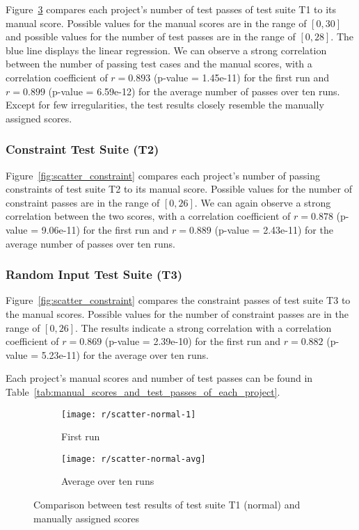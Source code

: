 Figure~\ref{fig:scatter_normal} compares each project's number of test passes of test suite T1 to its manual score.
Possible values for the manual scores are in the range of $[0, 30]$ and possible values for the number of test passes are in the range of $[0, 28]$.
The blue line displays the linear regression.
We can observe a strong correlation between the number of passing test cases and the manual scores,
with a correlation coefficient of $r = 0.893$ (p-value = 1.45e-11) for the first run and $r = 0.899$ (p-value = 6.59e-12) for the average number of passes over ten runs.
Except for few irregularities, the test results closely resemble the manually assigned scores.

\subsubsection{Constraint Test Suite (T2)}

Figure~\ref{fig:scatter_constraint} compares each project's number of passing constraints of test suite T2 to its manual score.
Possible values for the number of constraint passes are in the range of $[0, 26]$.
We can again observe a strong correlation between the two scores,
with a correlation coefficient of $r = 0.878$ (p-value = 9.06e-11) for the first run and $r = 0.889$ (p-value = 2.43e-11) for the average number of passes over ten runs.

\subsubsection{Random Input Test Suite (T3)}

Figure~\ref{fig:scatter_constraint} compares the constraint passes of test suite T3 to the manual scores.
Possible values for the number of constraint passes are in the range of $[0, 26]$.
The results indicate a strong correlation with a correlation coefficient of $r = 0.869$ (p-value = 2.39e-10) for the first run and $r = 0.882$ (p-value = 5.23e-11) for the average over ten runs.
\parspace

\noindent Each project's manual scores and number of test passes can be found in Table~\ref{tab:manual_scores_and_test_passes_of_each_project}.

\begin{figure}[htpb]
    \centering
    \begin{subfigure}{.85\textwidth}
        \texttt{[image: r/scatter-normal-1]}
        \caption{First run}
        \label{fig:scatter_normal_1}
    \end{subfigure}

    \bigskip

    \begin{subfigure}{.85\textwidth}
        \texttt{[image: r/scatter-normal-avg]}
        \caption{Average over ten runs}
        \label{fig:scatter_normal_avg}
    \end{subfigure}
    \caption{Comparison between test results of test suite T1 (normal) and manually assigned scores}
    \label{fig:scatter_normal}
\end{figure}

